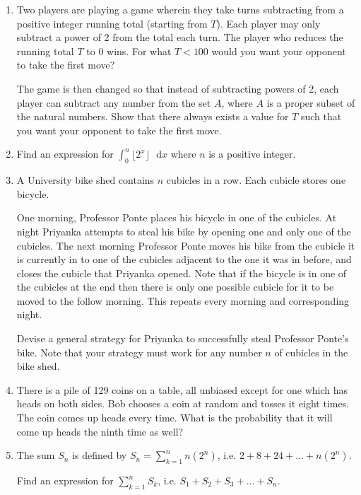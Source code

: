 \documentclass{article}
\begin{document}
\begin{enumerate}
    \item
    Two players are playing a game wherein they take turns subtracting from a positive integer running total (starting from $T$). Each player may only subtract a power of 2 from the total each turn. The player who reduces the running total $T$ to 0 wins. For what $T<100$ would you want your opponent to take the first move?
    
    The game is then changed so that instead of subtracting powers of 2, each player can subtract any number from the set $A$, where $A$ is a proper subset of the natural numbers. Show that there always exists a value for $T$ such that you want your opponent to take the first move.
    
    \item
    Find an expression for $\int_0^n \lfloor 2^x \rfloor \text{ } \mathrm{d}x$ where $n$ is a positive integer.
    
    \item
    A University bike shed contains $n$ cubicles in a row. Each cubicle stores one bicycle. 
    
    One morning, Professor Ponte places his bicycle in one of the cubicles. At night Priyanka attempts to steal his bike by opening one and only one of the cubicles. The next morning Professor Ponte moves his bike from the cubicle it is currently in to one of the cubicles adjacent to the one it was in before, and closes the cubicle that Priyanka opened. Note that if the bicycle is in one of the cubicles at the end then there is only one possible cubicle for it to be moved to the follow morning. This repeats every morning and corresponding night.
    
    Devise a general strategy for Priyanka to successfully steal Professor Ponte's bike. Note that your strategy must work for any number $n$ of cubicles in the bike shed.
    
    \item
    There is a pile of 129 coins on a table, all unbiased except for one which has heads on both sides. Bob chooses a coin at random and tosses it eight times. The coin comes up heads every time. What is the probability that it will come up heads the ninth time as well?
    
    \item
    The sum $S_n$ is defined by $S_n = \sum\limits_{k=1}^{n} n(2^n)$, i.e. $2 + 8 + 24 + ... + n(2^n)$.
    
    Find an expression for $\sum\limits_{k=1}^n S_k$, i.e. $S_1 + S_2 + S_3 + ... + S_n$.
    

\end{enumerate}
\end{document}
